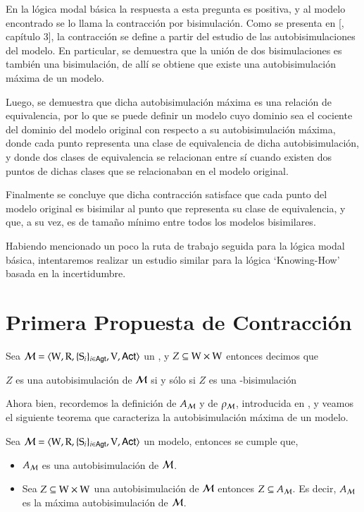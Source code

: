 En la lógica modal básica la respuesta a esta pregunta es positiva, y al modelo encontrado se lo llama la contracción por bisimulación.
Como se presenta en [\cite{HandbookModalLogic}, capítulo 3], la contracción se define a partir del estudio de las autobisimulaciones del modelo. En particular,
se demuestra que la unión de dos bisimulaciones es también una bisimulación, de allí se obtiene que existe una autobisimulación máxima de un modelo.

Luego, se demuestra que dicha autobisimulación máxima es una relación de equivalencia, por lo que se puede definir un modelo cuyo dominio sea el cociente
del dominio del modelo original con respecto a su autobisimulación máxima, donde cada punto representa una clase de equivalencia de dicha autobisimulación, y donde 
dos clases de equivalencia se relacionan entre sí cuando existen dos puntos de dichas clases que se relacionaban en el modelo original.

Finalmente se concluye que dicha contracción satisface que cada punto del modelo original es bisimilar al punto que representa su clase de equivalencia, y 
que, a su vez, es de tamaño mínimo entre todos los modelos bisimilares.

Habiendo mencionado un poco la ruta de trabajo seguida para la lógica modal básica, intentaremos realizar un estudio similar para la lógica `Knowing-How' basada en la 
incertidumbre.

\section{Primera Propuesta de Contracción}

\begin{definicion}
    Sea $\mathcal{M}=\langle \mathrm{W},\mathrm{R},\{ \mathrm{S}_i \}_{i \in {\rm \sf Agt}},\mathrm{V},{\rm \sf Act} \rangle$ un \ults, y $Z \subseteq \mathrm{W} \times \mathrm{W}$ entonces decimos que
    \begin{center}
        $Z$ es una autobisimulación de $\mathcal{M}$ si y sólo si $Z$ es una \KHilogic-bisimulación        
    \end{center}
\end{definicion}

Ahora bien, recordemos la definición de $A_{\mathcal{M}}$ y de $\rho_{\mathcal{M}}$, introducida en , y veamos el siguiente teorema 
que caracteriza la autobisimulación máxima de un modelo.

\begin{teorema}
    Sea $\mathcal{M}=\langle \mathrm{W},\mathrm{R},\{ \mathrm{S}_i \}_{i \in {\rm \sf Agt}},\mathrm{V},{\rm \sf Act} \rangle$ un modelo, entonces se cumple que,
    \begin{itemize}
        \item $A_{\mathcal{M}}$ es una autobisimulación de $\mathcal{M}$.
        \item Sea $Z \subseteq \mathrm{W} \times \mathrm{W}$ una autobisimulación de $\mathcal{M}$ entonces $Z \subseteq A_{\mathcal{M}}$. 
        Es decir, $A_{\mathcal{M}} $ es la máxima autobisimulación de $\mathcal{M}$. 
    \end{itemize}
\end{teorema}

